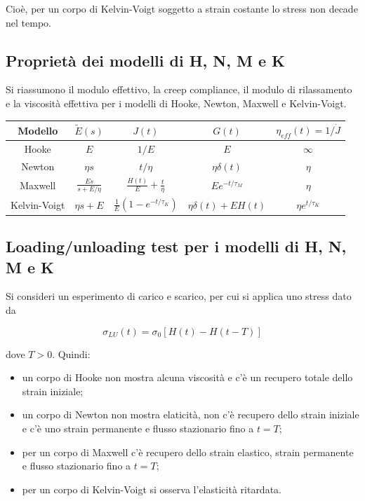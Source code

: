 \documentclass[a4paper,12pt]{book}
\begin{document}
\noindent
Cioè, per un corpo di Kelvin-Voigt soggetto a strain costante lo stress non decade nel tempo.

\subsection{\textcolor{colore7}{Proprietà dei modelli di H, N, M e K}}

Si riassumono il modulo effettivo, la creep compliance, il modulo di rilassamento e la viscosità effettiva per i modelli di Hooke, Newton, Maxwell e Kelvin-Voigt.

\begin{table}[htb]
\centering
\renewcommand{\arraystretch}{1.3}
\setlength{\tabcolsep}{8pt}
\begin{tabular}{|c|c|c|c|c|}
    \hline
    \textbf{Modello} & $\tilde{E}(s)$ & $J(t)$ & $G(t)$ & $\eta_{eff}(t) = 1/\dot{J}$ \\
    \hline
    \rowcolor{colore7!40}
    Hooke & $E$ & $1/E$ & $E$ & $\infty$ \\
    \hline
    \rowcolor{colore2!40}
    Newton & $\eta s$ & $t/\eta$ & $\eta \delta(t)$ & $\eta$ \\
    \hline
    \rowcolor{colore4!40}
    Maxwell & $\frac{Es}{s + E/\eta}$ & $\frac{H(t)}{E} + \frac{t}{\eta}$ & $E e^{-t/\tau_M}$ & $\eta$ \\
    \hline
    \rowcolor{colore5!40}
    Kelvin-Voigt & $\eta s + E$ & $\frac{1}{E} (1 - e^{-t/\tau_K})$ & $\eta \delta (t) + EH (t)$ & $\eta e^{t/\tau_K}$ \\
    \hline
\end{tabular}
\end{table}

\subsection{\textcolor{colore7}{Loading/unloading test per i modelli di H, N, M e K}}

Si consideri un esperimento di carico e scarico, per cui si applica uno stress dato da

\begin{equation}
    \sigma_{LU} (t) = \sigma_0 [H(t) - H(t-T)]    
\end{equation}

\noindent
dove $T>0$. Quindi:

\begin{itemize}
    \item un corpo di Hooke non mostra alcuna viscosità e c'è un recupero totale dello strain iniziale;
    \item un corpo di Newton non mostra elaticità, non c'è recupero dello strain iniziale e c'è uno strain permanente e flusso stazionario fino a $t=T$;
    \item per un corpo di Maxwell c'è recupero dello strain elastico, strain permanente e flusso stazionario fino a $t=T$;
    \item per un corpo di Kelvin-Voigt si osserva l'elasticità ritardata.
\end{itemize}
\end{document}
